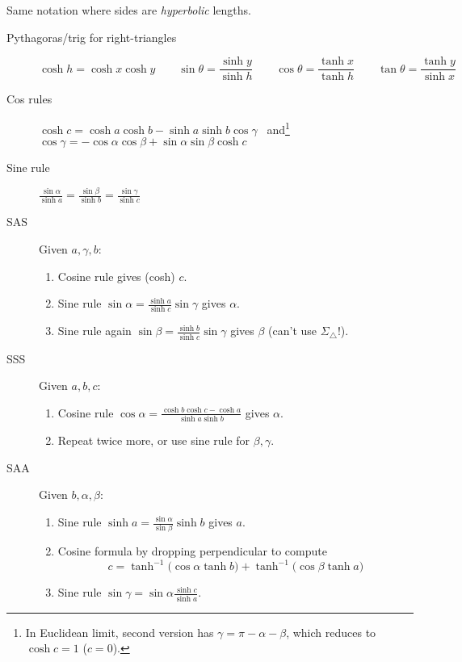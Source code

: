 \clearpage


Same notation where sides are \emph{hyperbolic} lengths. 

\begin{description}
	\item[Pythagoras/trig for right-triangles]
	\[
		\cosh h=\cosh x\cosh y\qquad\sin\theta=\frac{\sinh y}{\sinh h}\qquad \cos\theta=\frac{\tanh x}{\tanh h}\qquad \tan\theta=\frac{\tanh y}{\sinh x}
	\]
	
	\item[Cos rules] $\cosh c=\cosh a\cosh b-\sinh a\sinh b\cos\gamma$ \ and\footnote{In Euclidean limit, second version has $\gamma=\pi-\alpha-\beta$, which reduces to $\cosh c=1$ ($c=0$).} \ $\cos\gamma=-\cos\alpha\cos\beta+\sin\alpha\sin\beta\cosh c$
	
	\item[Sine rule] $\frac{\sin\alpha}{\sinh a} =\frac{\sin\beta}{\sinh b} =\frac{\sin\gamma}{\sinh c}$
	
	\goodbreak
	
	\item[SAS] Given $a,\gamma,b$:
	\begin{enumerate}
	  \item Cosine rule gives (cosh) $c$.
	  \item Sine rule $\sin\alpha=\frac{\sinh a}{\sinh c}\sin\gamma$ gives $\alpha$.
	  \item Sine rule again $\sin\beta=\frac{\sinh b}{\sinh c}\sin\gamma$ gives $\beta$ (can't use $\Sigma_\triangle$!).
	\end{enumerate}
	
	\item[SSS] Given $a,b,c$:
	\begin{enumerate}
	  \item Cosine rule $\cos\alpha=\frac{\cosh b\cosh c-\cosh a}{\sinh a\sinh b}$ gives $\alpha$.
	  \item Repeat twice more, or use sine rule for $\beta,\gamma$.
	\end{enumerate}
	
	\item[SAA] Given $b,\alpha,\beta$:
	\begin{enumerate}
	  \item Sine rule $\sinh a=\frac{\sin\alpha}{\sin\beta}\sinh b$ gives $a$.
	  \item Cosine formula by dropping perpendicular to compute
	  \[
	  	c=\tanh^{-1}\bigl(\cos\alpha\tanh b\bigr) + \tanh^{-1}\bigl(\cos\beta\tanh a\bigr)
	  \]
	  \item Sine rule $\sin\gamma=\sin\alpha\frac{\sinh c}{\sinh a}$.
	\end{enumerate}
	

\end{description}
